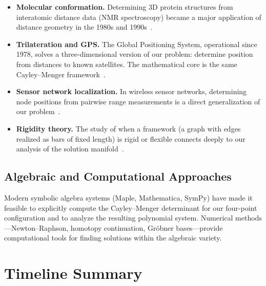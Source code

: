 \begin{itemize}
    \item \textbf{Molecular conformation.} Determining 3D protein structures from interatomic distance data (NMR spectroscopy) became a major application of distance geometry in the 1980s and 1990s~\citep{crippen1988distance}.

    \item \textbf{Trilateration and GPS.} The Global Positioning System, operational since 1978, solves a three-dimensional version of our problem: determine position from distances to known satellites. The mathematical core is the same Cayley--Menger framework~\citep{thomas2005revisiting}.

    \item \textbf{Sensor network localization.} In wireless sensor networks, determining node positions from pairwise range measurements is a direct generalization of our problem~\citep{so2007theory}.

    \item \textbf{Rigidity theory.} The study of when a framework (a graph with edges realized as bars of fixed length) is rigid or flexible connects deeply to our analysis of the solution manifold~\citep{connelly2005generic}.
\end{itemize}

\subsection{Algebraic and Computational Approaches}

Modern symbolic algebra systems (Maple, Mathematica, SymPy) have made it feasible to explicitly compute the Cayley--Menger determinant for our four-point configuration and to analyze the resulting polynomial system. Numerical methods---Newton--Raphson, homotopy continuation, Gr\"obner bases---provide computational tools for finding solutions within the algebraic variety.

\section{Timeline Summary}

